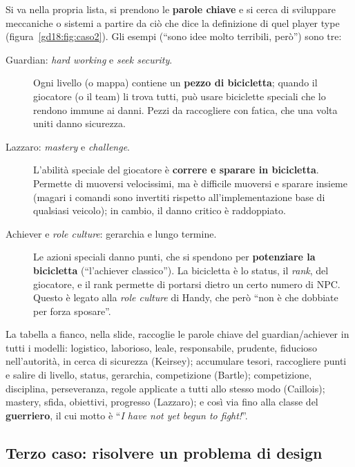 Si va nella propria lista, si prendono le \textbf{parole chiave} e si cerca di
sviluppare meccaniche o sistemi a partire da ciò che dice la definizione di quel
player type (figura~\ref{gd18:fig:caso2}). Gli esempi (``sono idee molto terribili,
però'') sono tre:
\begin{description}
  \item[Guardian: \emph{hard working} e \emph{seek security}.] Ogni livello (o
        mappa) contiene un \textbf{pezzo di bicicletta}; quando il giocatore (o il
        team) li trova tutti, può usare biciclette speciali che lo rendono immune ai
        danni. Pezzi da raccogliere con fatica, che una volta uniti danno sicurezza.
  \item[Lazzaro: \emph{mastery} e \emph{challenge}.] L'abilità speciale del giocatore
        è \textbf{correre e sparare in bicicletta}. Permette di muoversi
        velocissimi, ma è difficile muoversi e sparare insieme (magari i comandi sono
        invertiti rispetto all'implementazione base di qualsiasi veicolo); in cambio,
        il danno critico è raddoppiato.
  \item[Achiever e \emph{role culture}: gerarchia e lungo termine.] Le azioni
        speciali danno punti, che si spendono per \textbf{potenziare la bicicletta}
        (``l'achiever classico''). La bicicletta è lo status, il \emph{rank}, del
        giocatore, e il rank permette di portarsi dietro un certo numero di NPC.
        Questo è legato alla \emph{role culture} di Handy, che però ``non è che
        dobbiate per forza sposare''.
\end{description}
La tabella a fianco, nella slide, raccoglie le parole chiave del guardian/achiever in
tutti i modelli: logistico, laborioso, leale, responsabile, prudente, fiducioso
nell'autorità, in cerca di sicurezza (Keirsey); accumulare tesori, raccogliere punti e
salire di livello, status, gerarchia, competizione (Bartle); competizione, disciplina,
perseveranza, regole applicate a tutti allo stesso modo (Caillois); mastery, sfida,
obiettivi, progresso (Lazzaro); e così via fino alla classe del \textbf{guerriero}, il
cui motto è ``\emph{I have not yet begun to fight!}''.

\subsection{Terzo caso: risolvere un problema di design}


